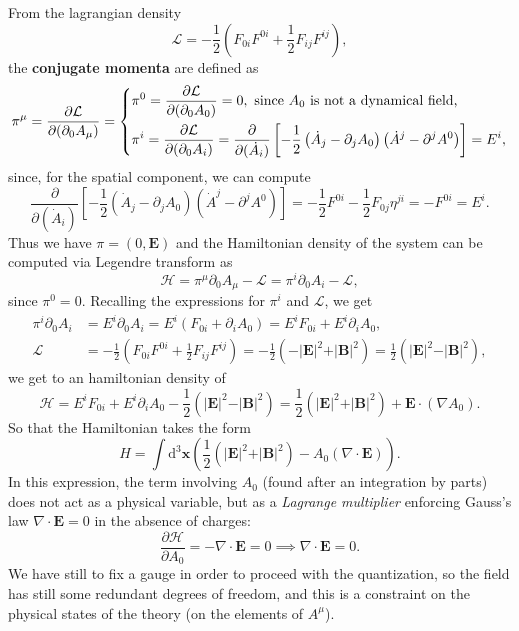 From the lagrangian density
\[
    \mathcal{L} = -\frac{1}{2} \left( F_{0i}F^{0i} + \frac{1}{2}F_{ij}F^{ij} \right),
\]
the \textbf{conjugate momenta} are defined as
\[
    \pi^{\mu} = \frac{\partial \mathcal{L}}{\partial (\partial_0 A_{\mu})} = \begin{dcases}
        \pi^0 = \frac{\partial \mathcal{L}}{\partial (\partial_0 A_{0})} = 0, \text{ since } A_0 \text{ is not a dynamical field,} \\
        \pi^i = \frac{\partial \mathcal{L}}{\partial (\partial_0 A_{i})} = \frac{\partial}{\partial (\dot{A}_{i})} \left[-\frac{1}{2}\left(\dot{A}_j - \partial_j A_0\right)\left(\dot{A}^j - \partial^j A^0\right)\right] = E^i,
    \end{dcases}
\]
since, for the spatial component, we can compute
\[
    \frac{\partial}{\partial (\dot{A}_{i})} \left[-\frac{1}{2}\left(\dot{A}_j - \partial_j A_0\right)\left(\dot{A}^j - \partial^j A^0\right)\right] = -\frac{1}{2} F^{0i} -\frac{1}{2}F_{0j}\eta^{ji} = -F^{0i} = E^i.
\]
Thus we have \(\pi = (0, \mathbf{E})\) and the Hamiltonian density of the system can be computed via Legendre transform as
\[
    \mathcal{H} = \pi^{\mu} \partial_0 A_{\mu} - \mathcal{L} = \pi^{i} \partial_0 A_{i} - \mathcal{L},
\]
since \(\pi^0 = 0\). Recalling the expressions for \(\pi^i\) and \(\mathcal{L}\), we get
\[
    \begin{aligned}
        \pi^{i} \partial_0 A_{i} & = E^{i} \partial_0 A_{i} = E^{i} \left( F_{0i} + \partial_i A_0 \right) = E^{i} F_{0i} + E^{i} \partial_i A_0,                                                                                                                            \\
        \mathcal{L}              & = -\frac{1}{2} \left( F_{0i}F^{0i} + \frac{1}{2}F_{ij}F^{ij} \right) = -\frac{1}{2} \left( -\vert \mathbf{E} \vert^2 + \vert \mathbf{B} \vert^2 \right) = \frac{1}{2} \left( \vert \mathbf{E} \vert^2 - \vert \mathbf{B} \vert^2 \right),
    \end{aligned}
\]
we get to an hamiltonian density of
\[
    \mathcal{H} = E^{i} F_{0i} + E^{i} \partial_i A_0 - \frac{1}{2} \left( \vert \mathbf{E} \vert^2 - \vert \mathbf{B} \vert^2 \right) = \frac{1}{2} \left( \vert \mathbf{E} \vert^2 + \vert \mathbf{B} \vert^2 \right) + \mathbf{E} \cdot (\nabla A_0).
\]
So that the Hamiltonian takes the form
\[
    H = \int \mathrm{d}^3 \mathbf{x} \left( \frac{1}{2} \left( \vert \mathbf{E} \vert^2 + \vert \mathbf{B} \vert^2 \right) - A_0 (\nabla \cdot \mathbf{E}) \right).
\]
In this expression, the term involving \(A_0\) (found after an integration by parts) does not act as a physical variable, but as a \textit{Lagrange multiplier} enforcing Gauss's law \(\nabla \cdot \mathbf{E} = 0\) in the absence of charges:
\[
    \frac{\partial \mathcal{H}}{\partial A_0} = -\nabla \cdot \mathbf{E} = 0 \implies \nabla \cdot \mathbf{E} = 0.
\]
We have still to fix a gauge in order to proceed with the quantization, so the field has still some redundant degrees of freedom, and this is a constraint on the physical states of the theory (on the elements of \(A^{\mu}\)).

